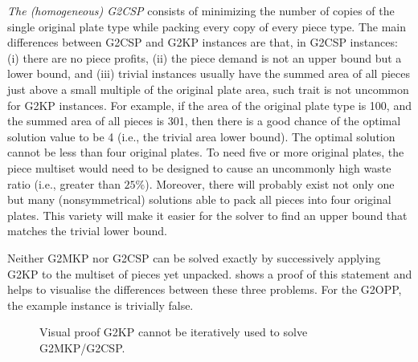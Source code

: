 \emph{The (homogeneous) G2CSP} consists of minimizing the number of copies of the single original plate type while packing every copy of every piece type.
The main differences between G2CSP and G2KP instances are that, in G2CSP instances: (i) there are no piece profits, (ii) the piece demand is not an upper bound but a lower bound, and (iii) trivial instances usually have the summed area of all pieces just above a small multiple of the original plate area, such trait is not uncommon for G2KP instances.
For example, if the area of the original plate type is 100, and the summed area of all pieces is 301, then there is a good chance of the optimal solution value to be 4 (i.e., the trivial area lower bound).
The optimal solution cannot be less than four original plates. To need five or more original plates, the piece multiset would need to be designed to cause an uncommonly high waste ratio (i.e., greater than \(25\%\)).
Moreover, there will probably exist not only one but many (nonsymmetrical) solutions able to pack all pieces into four original plates. This variety will make it easier for the solver to find an upper bound that matches the trivial lower bound.

Neither G2MKP nor G2CSP can be solved exactly by successively applying G2KP to the multiset of pieces yet unpacked.
 shows a proof of this statement and helps to visualise the differences between these three problems.
For the G2OPP, the example instance is trivially false.

\begin{figure}[h]
  \caption{Visual proof G2KP cannot be iteratively used to solve G2MKP/G2CSP.}
  \center
  
  \vspace{3mm}
  \label{fig:related_problems_diagram}
\end{figure}

